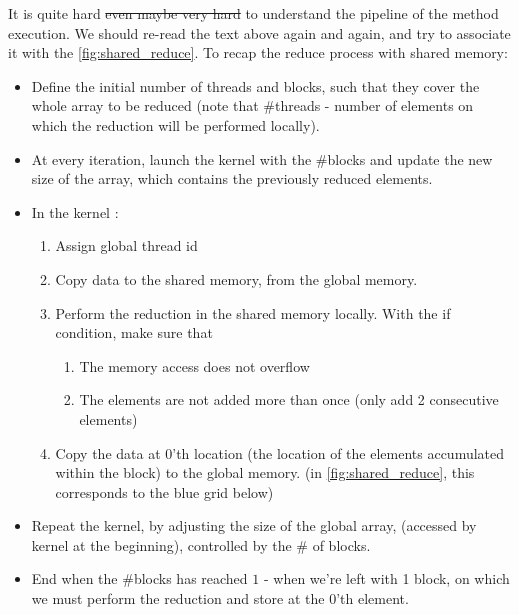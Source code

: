 \documentclass[12pt]{article}
\begin{document}
It is quite hard \sout{even maybe very hard} to understand the pipeline of the method execution. 
We should re-read the text above again and again, and try to associate it with the \autoref{fig:shared_reduce}.
To recap the reduce process with shared memory:  

 \begin{itemize}
   \setlength\itemsep{-0.5em}
    \item Define the initial number of threads and blocks, such that they cover the whole 
    array to be reduced (note that \#threads - number of elements on which the reduction will be performed locally).
    \item At every iteration, launch the kernel with the \#blocks and update the new size of the array, which 
    contains the previously reduced elements. 
    \item In the kernel : \begin{enumerate}
                           \setlength\itemsep{-0.2em}
                        \item Assign global thread id
                        \item Copy data to the shared memory, from the global memory.
                        \item Perform the reduction in the shared memory locally. With the if condition, make sure that 
                        \begin{enumerate}
                           \setlength\itemsep{-0.2em}
                           \item The memory access does not overflow
                           \item The elements are not added more than once (only add 2 consecutive elements)
                        \end{enumerate}
                        \item Copy the data at 0'th location (the location of the elements accumulated within the block) to the global memory.
                        (in \autoref{fig:shared_reduce}, this corresponds to the blue grid below)
                        
                        \end{enumerate} 
   \item Repeat the kernel, by adjusting the size of the global array, (accessed by kernel at the beginning), 
   controlled by the \# of blocks. 
   \item End when the \#blocks has reached $1$ - when we're left with 1 block, on which we must 
   perform the reduction and store at the 0'th element.
\end{itemize}
\end{document}
